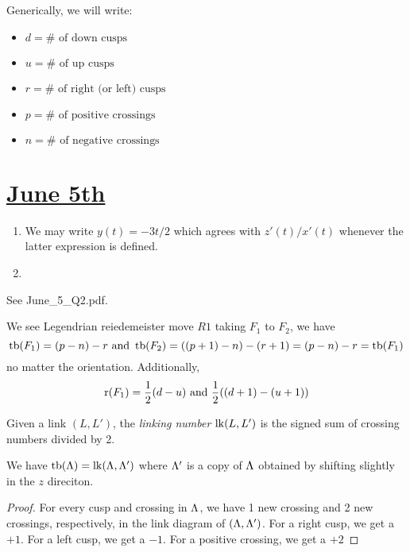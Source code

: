 \documentclass[11pt,letterpaper]{article}
\begin{document}
\tableofcontents
\newpage
{}
\rhead{\today}%
{} %

Generically, we will write:
\begin{itemize}
    \item  $d= \# \text{ of down cusps}$
    \item  $u= \# \text{ of up cusps}$
    \item  $r= \# \text{ of right (or left) cusps}$
    \item  $p= \# \text{ of positive crossings}$
    \item  $n= \# \text{ of negative crossings}$
\end{itemize}

\section*{\underline{June 5th}}

\begin{enumerate}[label=(\alph*)]
    \item We may write $y(t)=-3t/2$ which agrees with $z'(t)/x'(t)$ whenever the latter expression is defined.
    \item \TODO
\end{enumerate}

See June\_5\_Q2.pdf.



We see Legendrian reiedemeister move $R1$ taking $F_1$ to $F_2$, we have
    \[\operatorname{tb}(F_1)=(p-n)-r \text{ and } \operatorname{tb}(F_2)=((p+1)-n)-(r+1)=(p-n)-r=\operatorname{tb}(F_1)\]
no matter the orientation. Additionally,
\[\operatorname{r}(F_1)=\frac{1}{2}(d-u) \text{ and } \frac{1}{2}((d+1)-(u+1))\]



\begin{definition}
    Given a link $(L,L')$, the \textit{linking number} $\operatorname{lk}(L,L')$ is the signed sum of crossing numbers divided by 2.
\end{definition}

\begin{prop}
    We have $\operatorname{tb}(\Lambda)=\operatorname{lk}(\Lambda,\Lambda')$ where $\Lambda'$ is a copy of $\Lambda$ obtained by shifting slightly in the $z$ direciton.
\end{prop}

\begin{proof}
    For every cusp and crossing in $\Lambda$, we have 1 new crossing and 2 new crossings, respectively, in the link diagram of $(\Lambda,\Lambda')$. For a right cusp, we get a $+1$. For a left cusp, we get a $-1$. For a positive crossing, we get a $+2$

    \TODO
\end{proof}
\end{document}

